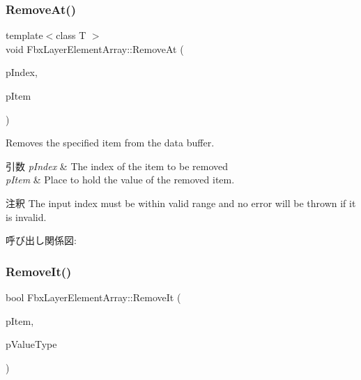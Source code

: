 \subsubsection{\texorpdfstring{Remove\+At()}{RemoveAt()}\hspace{0.1cm}{\footnotesize\ttfamily [2/2]}}
{\footnotesize\ttfamily template$<$class T $>$ \\
void Fbx\+Layer\+Element\+Array\+::\+Remove\+At (\begin{DoxyParamCaption}\item[{int}]{p\+Index,  }\item[{T $\ast$}]{p\+Item }\end{DoxyParamCaption})}

Removes the specified item from the data buffer. 
\begin{DoxyParams}{引数}
{\em p\+Index} & The index of the item to be removed \\
\hline
{\em p\+Item} & Place to hold the value of the removed item. \\
\hline
\end{DoxyParams}
\begin{DoxyRemark}{注釈}
The input index must be within valid range and no error will be thrown if it is invalid. 
\end{DoxyRemark}
呼び出し関係図\+:
\mbox{\label{class_fbx_layer_element_array_a759b4eac1b85286b6eae39b588eb74ad}} 
\subsubsection{\texorpdfstring{Remove\+It()}{RemoveIt()}\hspace{0.1cm}{\footnotesize\ttfamily [1/2]}}
{\footnotesize\ttfamily bool Fbx\+Layer\+Element\+Array\+::\+Remove\+It (\begin{DoxyParamCaption}\item[{void $\ast$$\ast$}]{p\+Item,  }\item[{\hyperlink{fbxpropertytypes_8h_a73913a5ddfb20e57c6f25e9e6784bd92}{E\+Fbx\+Type}}]{p\+Value\+Type }\end{DoxyParamCaption})}

